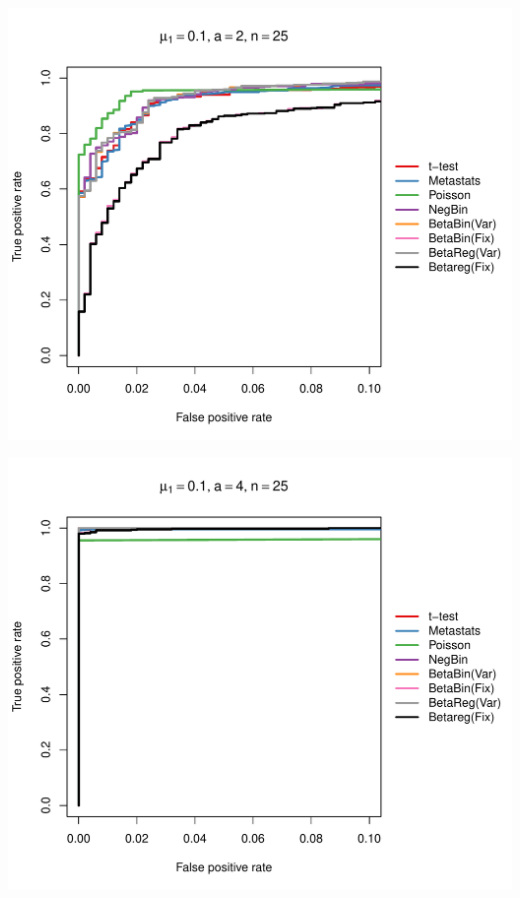 \documentclass[12pt]{article}\usepackage{graphicx, color}
\makeatletter
\def\maxwidth{ %
  \ifdim\Gin@nat@width>\linewidth
    \linewidth
  \else
    \Gin@nat@width
  \fi
}
\newenvironment{knitrout}{}{} %
\makeatother
\begin{document}
\begin{knitrout}
{\centering \includegraphics[width=\maxwidth]{figure/rocs65} 

}




{\centering \includegraphics[width=\maxwidth]{figure/rocs66} 

}





\end{knitrout}
\end{document}
